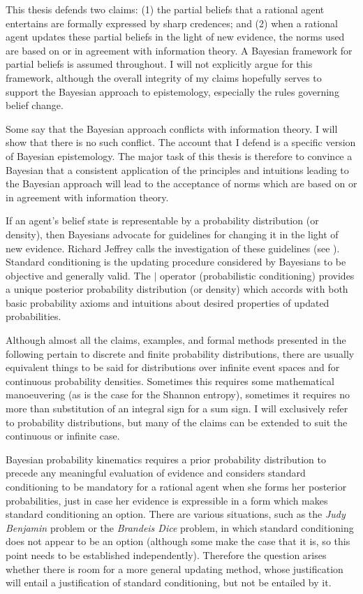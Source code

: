 This thesis defends two claims: (1) the partial beliefs that a
rational agent entertains are formally expressed by sharp credences;
and (2) when a rational agent updates these partial beliefs in the
light of new evidence, the norms used are based on or in agreement
with information theory. A Bayesian framework for partial beliefs is
assumed throughout. I will not explicitly argue for this framework,
although the overall integrity of my claims hopefully serves to
support the Bayesian approach to epistemology, especially the rules
governing belief change. 

Some say that the Bayesian approach conflicts with information theory.
I will show that there is no such conflict. The account that I defend
is a specific version of Bayesian epistemology. The major task of this
thesis is therefore to convince a Bayesian that a consistent
application of the principles and intuitions leading to the Bayesian
approach will lead to the acceptance of norms which are based on or in
agreement with information theory.

If an agent's belief state is representable by a probability
distribution (or density), then Bayesians advocate for guidelines for
changing it in the light of new evidence. Richard Jeffrey calls the
investigation of these guidelines  (see
). Standard conditioning is the updating
procedure considered by Bayesians to be objective and generally valid.
The $\mid$ operator (probabilistic conditioning) provides a unique
posterior probability distribution (or density) which accords with
both basic probability axioms and intuitions about desired properties
of updated probabilities.

Although almost all the claims, examples, and formal methods presented
in the following pertain to discrete and finite probability
distributions, there are usually equivalent things to be said for
distributions over infinite event spaces and for continuous
probability densities. Sometimes this requires some mathematical
manoeuvering (as is the case for the Shannon entropy), sometimes it
requires no more than substitution of an integral sign for a sum sign.
I will exclusively refer to probability distributions, but many of the
claims can be extended to suit the continuous or infinite case.

Bayesian probability kinematics requires a prior probability
distribution to precede any meaningful evaluation of evidence and
considers standard conditioning to be mandatory for a rational agent
when she forms her posterior probabilities, just in case her evidence
is expressible in a form which makes standard conditioning an option.
There are various situations, such as the \emph{Judy Benjamin} problem
or the \emph{Brandeis Dice} problem, in which standard conditioning
does not appear to be an option (although some make the case that it
is, so this point needs to be established independently). Therefore
the question arises whether there is room for a more general updating
method, whose justification will entail a justification of standard
conditioning, but not be entailed by it.

